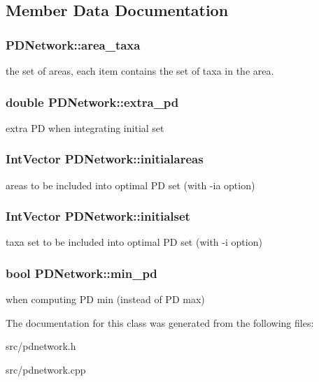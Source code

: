 \subsection{Member Data Documentation}
\hypertarget{classPDNetwork_a74a7b822f5483c3a6e2e6bbdc98ef1a3}{
\subsubsection[{area\_\-taxa}]{ {\bf PDNetwork::area\_\-taxa}}}
\label{classPDNetwork_a74a7b822f5483c3a6e2e6bbdc98ef1a3}
the set of areas, each item contains the set of taxa in the area. \hypertarget{classPDNetwork_a0a092e4f0267eb88e6459e9e7e552b14}{
\subsubsection[{extra\_\-pd}]{\setlength{\rightskip}{0pt plus 5cm}double {\bf PDNetwork::extra\_\-pd}}}
\label{classPDNetwork_a0a092e4f0267eb88e6459e9e7e552b14}
extra PD when integrating initial set \hypertarget{classPDNetwork_ae82636a4b7ce25ca1604cceefc79bb6a}{
\subsubsection[{initialareas}]{\setlength{\rightskip}{0pt plus 5cm}IntVector {\bf PDNetwork::initialareas}}}
\label{classPDNetwork_ae82636a4b7ce25ca1604cceefc79bb6a}
areas to be included into optimal PD set (with -\/ia option) \hypertarget{classPDNetwork_a316ec40bb65670852e08371985d786e0}{
\subsubsection[{initialset}]{\setlength{\rightskip}{0pt plus 5cm}IntVector {\bf PDNetwork::initialset}}}
\label{classPDNetwork_a316ec40bb65670852e08371985d786e0}
taxa set to be included into optimal PD set (with -\/i option) \hypertarget{classPDNetwork_a2427fd91e8ae19784de05e574ea75dae}{
\subsubsection[{min\_\-pd}]{\setlength{\rightskip}{0pt plus 5cm}bool {\bf PDNetwork::min\_\-pd}}}
\label{classPDNetwork_a2427fd91e8ae19784de05e574ea75dae}
when computing PD min (instead of PD max) 

The documentation for this class was generated from the following files:\begin{DoxyCompactItemize}
\item 
src/pdnetwork.h\item 
src/pdnetwork.cpp\end{DoxyCompactItemize}
